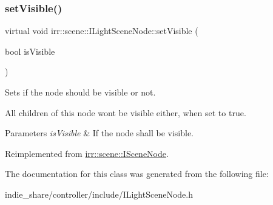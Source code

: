\subsubsection{\texorpdfstring{set\+Visible()}{setVisible()}}
{\footnotesize\ttfamily virtual void irr\+::scene\+::\+I\+Light\+Scene\+Node\+::set\+Visible (\begin{DoxyParamCaption}\item[{bool}]{is\+Visible }\end{DoxyParamCaption})\hspace{0.3cm}{\ttfamily [pure virtual]}}



Sets if the node should be visible or not. 

All children of this node won\textquotesingle{}t be visible either, when set to true. 
\begin{DoxyParams}{Parameters}
{\em is\+Visible} & If the node shall be visible. \\
\hline
\end{DoxyParams}


Reimplemented from \hyperlink{classirr_1_1scene_1_1ISceneNode_a2e3a88fe87d11caa7986a203afe6838c}{irr\+::scene\+::\+I\+Scene\+Node}.



The documentation for this class was generated from the following file\+:\begin{DoxyCompactItemize}
\item 
indie\+\_\+share/controller/include/I\+Light\+Scene\+Node.\+h\end{DoxyCompactItemize}
